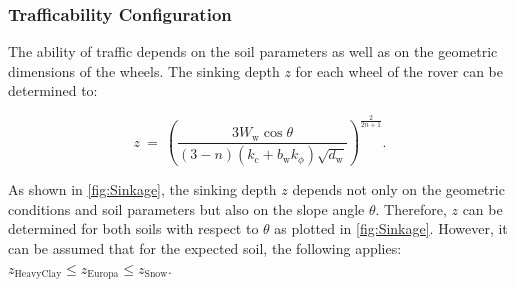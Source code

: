 \subsubsection*{Trafficability Configuration}
\label{sec:DP}

The ability of traffic depends on the soil parameters as well as on the geometric dimensions of the wheels. The sinking depth \(z\) for each wheel of the rover can be determined to:

\begin{equation}
	z \:  = \:	\left( \frac{3 W_\text{w} \cos \theta}{(3-n)(k_\text{c} + b_\text{w}k_\phi) \sqrt{d_\text{w}}} \right) ^{\frac{2}{2n+1}}	.
	\label{eq:Sinkage}
\end{equation}

As shown in \autoref{fig:Sinkage}, the sinking depth \(z\) depends not only on the geometric conditions and soil parameters but also on the slope angle \(\theta\). Therefore, \(z\) can be determined for both soils with respect to \(\theta\) as plotted in \autoref{fig:Sinkage}. However, it can be assumed that for the expected soil, the following applies: \( z_{\text{HeavyClay}} \leq z_{\text{Europa}} \leq z_{\text{Snow}} \).

